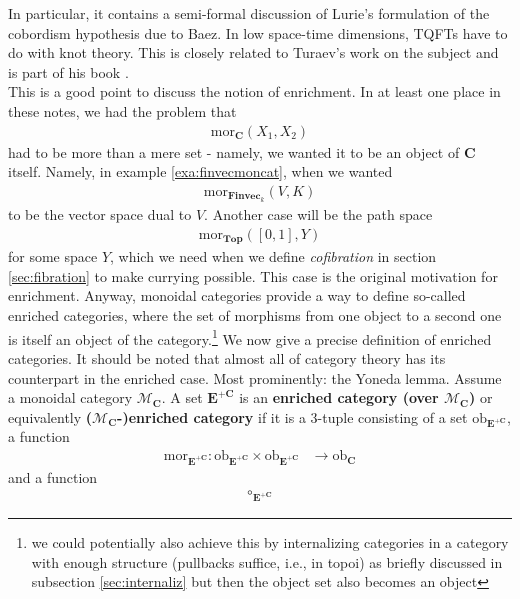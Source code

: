 In particular, it contains a semi-formal discussion of Lurie's formulation of the cobordism hypothesis due to Baez.
In low space-time dimensions, TQFTs have to do with knot theory.
This is closely related to Turaev's work on the subject and is part of his book \cite{24253327}.
\\
This is a good point to discuss the notion of {\glqq}enrichment{\grqq}.
In at least one place in these notes, we had the problem that
\begin{align*}
  \mathrm{mor}_{\mathbf{C}}(X_{1},X_{2})
\end{align*}
had to be more than a mere set - namely, we wanted it to be an object of $\mathbf{C}$ itself.
Namely, in example \ref{exa:finvecmoncat}, when we wanted
\begin{align*}
  \mathrm{mor}_{\mathbf{Finvec}_{k}}(V,K)
\end{align*}
to be the vector space dual to $V$.
Another case will be the path space
\begin{align*}
  \mathrm{mor}_{\mathbf{Top}}([0,1],Y)
\end{align*}
for some space $Y$, which we need when we define \textit{cofibration} in section \ref{sec:fibration} to make currying possible.
This case is the original motivation for enrichment.
Anyway, monoidal categories provide a way to define so-called enriched categories, where the set of morphisms from one object to a second one is itself an object of the category.\footnote{we could potentially also achieve this by internalizing categories in a category with enough structure (pullbacks suffice, i.e., in topoi) as briefly discussed in subsection \ref{sec:internaliz} but then the object set also becomes an object} We now give a precise definition of enriched categories.
It should be noted that almost all of category theory has its counterpart in the enriched case.
Most prominently: the Yoneda lemma.
Assume a monoidal category $\mathcal{M}_{\mathbf{C}}$.
A set $\mathbf{E}^{+\mathbf{C}}$ is an \textbf{enriched category (over $\mathcal{M}_{\mathbf{C}}$)} or equivalently \textbf{($\mathcal{M}_{\mathbf{C}}$-)enriched category} if it is a $3$-tuple consisting of a set $\mathrm{ob}_{\mathbf{E}^{+\mathbf{C}}}$, a function
\begin{align*}
  \mathrm{mor}_{\mathbf{E}^{+\mathbf{C}}}
  \colon
  \mathrm{ob}_{\mathbf{E}^{+\mathbf{C}}}
  \times
  \mathrm{ob}_{\mathbf{E}^{+\mathbf{C}}}
  &\rightarrow
  \mathrm{ob}_{\mathbf{C}}
\end{align*}
and a function
\begin{align*}
  \circ_{\mathbf{E}^{+\mathbf{C}}}
\end{align*}
